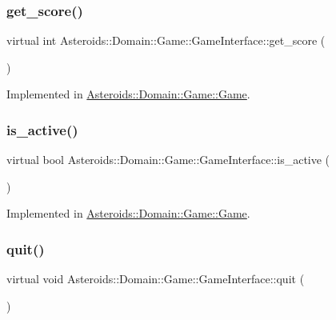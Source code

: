 \subsubsection{\texorpdfstring{get\+\_\+score()}{get\_score()}}
{\footnotesize\ttfamily virtual int Asteroids\+::\+Domain\+::\+Game\+::\+Game\+Interface\+::get\+\_\+score (\begin{DoxyParamCaption}{ }\end{DoxyParamCaption})\hspace{0.3cm}{\ttfamily [pure virtual]}}



Implemented in \hyperlink{classAsteroids_1_1Domain_1_1Game_1_1Game_ae2128bded3b91a2bbf7546009a8e5385}{Asteroids\+::\+Domain\+::\+Game\+::\+Game}.

\mbox{\label{classAsteroids_1_1Domain_1_1Game_1_1GameInterface_ad7519687f2a916cef85be8a68c6ce6a4}} 
\subsubsection{\texorpdfstring{is\+\_\+active()}{is\_active()}}
{\footnotesize\ttfamily virtual bool Asteroids\+::\+Domain\+::\+Game\+::\+Game\+Interface\+::is\+\_\+active (\begin{DoxyParamCaption}{ }\end{DoxyParamCaption})\hspace{0.3cm}{\ttfamily [pure virtual]}}



Implemented in \hyperlink{classAsteroids_1_1Domain_1_1Game_1_1Game_a29d018d13b934b31e4192758422fea68}{Asteroids\+::\+Domain\+::\+Game\+::\+Game}.

\mbox{\label{classAsteroids_1_1Domain_1_1Game_1_1GameInterface_a045096acf97a53c3827be8bd2795ec35}} 
\subsubsection{\texorpdfstring{quit()}{quit()}}
{\footnotesize\ttfamily virtual void Asteroids\+::\+Domain\+::\+Game\+::\+Game\+Interface\+::quit (\begin{DoxyParamCaption}{ }\end{DoxyParamCaption})\hspace{0.3cm}{\ttfamily [pure virtual]}}



